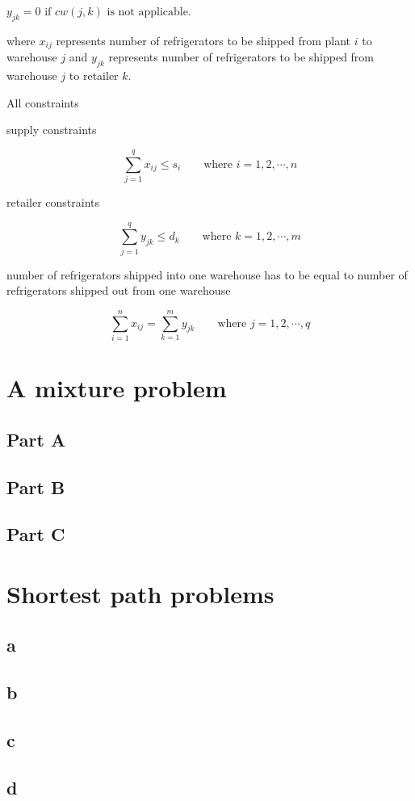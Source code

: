 \documentclass[11pt]{scrreprt}
\begin{document}
$y_{jk}=0 \textrm{ if } cw(j,k) \textrm{ is not applicable.} $

where $x_{ij}$ represents number of refrigerators to be shipped from plant $i$ to warehouse $j$ and $y_{jk}$ represents number of refrigerators to be shipped  from warehouse $j$ to retailer $k$.

All constraints

supply constraints

\begin{displaymath}
\sum_{j=1}^{q} x_{ij} \leq s_i \qquad\textrm{where } i=1,2,\cdots,n
\end{displaymath}

retailer constraints

\begin{displaymath}
\sum_{j=1}^{q} y_{jk} \leq d_k \qquad\textrm{where } k=1,2,\cdots,m
\end{displaymath}

number of refrigerators shipped into one warehouse has to be equal to number of refrigerators shipped out from one warehouse

\begin{displaymath}
\sum_{i=1}^{n} x_{ij} = \sum_{k=1}^{m} y_{jk} \qquad\textrm{where } j=1,2,\cdots,q
\end{displaymath}

\chapter{A mixture problem}

\section{Part A}


\section{Part B}
\section{Part C}

\chapter{Shortest path problems}

\section{a}
\section{b}
\section{c}
\section{d}
\end{document}
